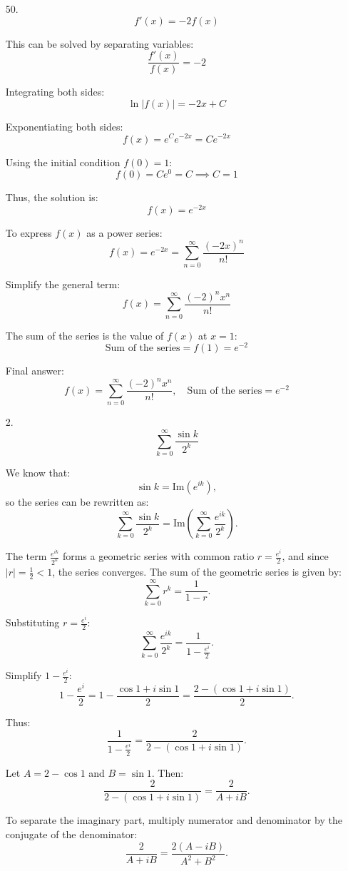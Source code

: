 \documentclass[12pt]{article}
\begin{document}
\begin{enumerate}
\item [50. ]
\[
f'(x) = -2f(x)
\]

This can be solved by separating variables:
\[
\frac{f'(x)}{f(x)} = -2
\]
    
Integrating both sides:
\[
\ln|f(x)| = -2x + C
\]

Exponentiating both sides:
\[
f(x) = e^C e^{-2x} = Ce^{-2x}
\]

Using the initial condition \( f(0) = 1 \):
\[
f(0) = Ce^{0} = C \implies C = 1
\]

Thus, the solution is:
\[
f(x) = e^{-2x}
\]

To express \( f(x) \) as a power series:
\[
f(x) = e^{-2x} = \sum_{n=0}^\infty \frac{(-2x)^n}{n!}
\]

Simplify the general term:
\[
f(x) = \sum_{n=0}^\infty \frac{(-2)^n x^n}{n!}
\]

The sum of the series is the value of \( f(x) \) at \( x = 1 \):
\[
\text{Sum of the series} = f(1) = e^{-2}
\]

Final answer:
\[
f(x) = \sum_{n=0}^\infty \frac{(-2)^n x^n}{n!}, \quad \text{Sum of the series} = e^{-2}
\]

\item [2. ]
\[
\sum_{k=0}^\infty \frac{\sin k}{2^k}
\]

We know that:
\[
\sin k = \text{Im}(e^{ik}),
\]
so the series can be rewritten as:
\[
\sum_{k=0}^\infty \frac{\sin k}{2^k} = \text{Im}\left( \sum_{k=0}^\infty \frac{e^{ik}}{2^k} \right).
\]

The term \(\frac{e^{ik}}{2^k}\) forms a geometric series with common ratio \(r = \frac{e^i}{2}\), and since \(|r| = \frac{1}{2} < 1\), the series converges. The sum of the geometric series is given by:
\[
\sum_{k=0}^\infty r^k = \frac{1}{1 - r}.
\]

Substituting \(r = \frac{e^i}{2}\):
\[
\sum_{k=0}^\infty \frac{e^{ik}}{2^k} = \frac{1}{1 - \frac{e^i}{2}}.
\]

Simplify \(1 - \frac{e^i}{2}\):
\[
1 - \frac{e^i}{2} = 1 - \frac{\cos 1 + i \sin 1}{2} = \frac{2 - (\cos 1 + i \sin 1)}{2}.
\]

Thus:
\[
\frac{1}{1 - \frac{e^i}{2}} = \frac{2}{2 - (\cos 1 + i \sin 1)}.
\]

Let \(A = 2 - \cos 1\) and \(B = \sin 1\). Then:
\[
\frac{2}{2 - (\cos 1 + i \sin 1)} = \frac{2}{A + iB}.
\]

To separate the imaginary part, multiply numerator and denominator by the conjugate of the denominator:
\[
\frac{2}{A + iB} = \frac{2(A - iB)}{A^2 + B^2}.
\]


\end{enumerate}
\end{document}
